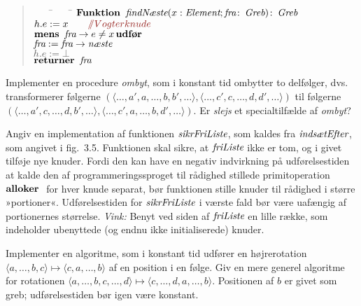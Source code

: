  \begin{quote}
  \begin{tabbing}
    ~~~~\=~~~~\=\kill
    $\Function\varname{findNæste}(x:\Element; \varname{fra}\colon\Handle)\colon \Handle$\\
    \>$h.e:= x\qquad\comment{Vogterknude}$\\
    \>$\while\varname{fra}\rightarrow e\neq x \ddo$\\
    \>\>$\varname{fra} :=\varname{fra}\rightarrow\varname{næste}$\\
    \>$h.e:=\bot$\\
    $\return\varname{fra}$
  \end{tabbing}
 \end{quote}

  \begin{exerc}
    Implementer en procedure \emph{ombyt}, som i konstant tid ombytter to delfølger, dvs. transformerer følgerne
    $(\langle \ldots, a',a,\ldots, b,b',\ldots\rangle,
    \langle \ldots, c',c,\ldots, d,d',\ldots\rangle)$
    til følgerne
    $(\langle \ldots, a',c,\ldots, d,b',\ldots\rangle,
    \langle \ldots, c',a,\ldots, b,d',\ldots\rangle)$.
    Er \emph{slejs} et specialtilfælde af \emph{ombyt}?
  \end{exerc}


  \begin{exerc}[Lagerhåndtering.]
    Angiv en implementation af funktionen $\varname{sikrFriListe}$, som kaldes fra $\varname{indsætEfter}$, som angivet i fig.~3.5.
    Funktionen skal sikre, at $\varname{friListe}$ ikke er tom, og i givet tilføje nye knuder.
    Fordi den kan have en negativ indvirkning på udførelsestiden at kalde den af programmeringssproget til rådighed stillede primitoperation $\allocate$ for hver knude separat, bør funktionen stille knuder til rådighed i større »portioner«.
    Udførelsestiden for $\varname{sikrFriListe}$ i værste fald bør være uafængig af portionernes størrelse.
    \emph{Vink:} 
    Benyt ved siden af $\varname{friListe}$ en lille række, som indeholder ubenyttede (og endnu ikke initialiserede) knuder.
  \end{exerc}

  \begin{exerc}
    Implementer en algoritme, som i konstant tid udfører en højrerotation
    $\langle a, \ldots, b,c\rangle \mapsto \langle c, a,\ldots, b\rangle$
    af en position i en følge.
    Giv en mere generel algoritme for rotationen
    $\langle a, \ldots, b,c,\ldots, d\rangle \mapsto \langle c,\ldots, d, a,\ldots, b\rangle$.
    Positionen af $b$ er givet som greb; udførelsestiden bør igen være konstant.
  \end{exerc}

